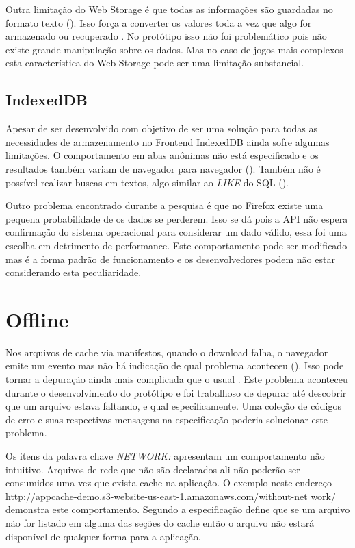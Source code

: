 Outra limitação do Web Storage é que todas as informações são
guardadas no formato texto (). Isso
força a converter os valores toda a vez que algo for armazenado ou
recuperado \autocite{gameAssetManagement}. No protótipo isso não foi
problemático pois não existe grande manipulação sobre os dados. Mas
no caso de jogos mais complexos esta característica do Web Storage pode
ser uma limitação substancial.

\subsection{IndexedDB}

Apesar de ser desenvolvido com objetivo de ser uma solução para
todas as necessidades de armazenamento no Frontend IndexedDB ainda
sofre algumas limitações. O comportamento em abas anônimas não
está especificado e os resultados também variam de navegador para
navegador (). Também não é
possível realizar buscas em textos, algo similar ao \textit{LIKE} do
SQL ().

Outro problema encontrado durante a pesquisa é que no Firefox existe
uma pequena probabilidade de os dados se perderem. Isso se dá pois a
API não espera confirmação do sistema operacional para considerar
um dado válido, essa foi uma escolha em detrimento de performance.
Este comportamento pode ser modificado mas é a forma padrão de
funcionamento e os desenvolvedores podem não estar considerando esta
peculiaridade.

\section{Offline}

Nos arquivos de cache via manifestos, quando o download falha, o
navegador emite um evento mas não há indicação de qual problema
aconteceu (). Isso pode tornar a
depuração ainda mais complicada que o usual \autocite{diveIntohtml}.
Este problema aconteceu durante o desenvolvimento do protótipo e foi
trabalhoso de depurar até descobrir que um arquivo estava faltando,
e qual especificamente. Uma coleção de códigos de erro e suas
respectivas mensagens na especificação poderia solucionar este
problema.

Os itens da palavra chave \textit{NETWORK:} apresentam um
comportamento não intuitivo. Arquivos de rede que não
são declarados ali não poderão ser consumidos uma vez
que exista cache na aplicação. O exemplo neste endereço
\url{http://appcache-demo.s3-website-us-east-1.amazonaws.com/without-net
work/} demonstra este comportamento. Segundo \citet{gameAssetManagement}
a especificação define que se um arquivo não for listado em alguma
das seções do cache então o arquivo não estará disponível de
qualquer forma para a aplicação.

